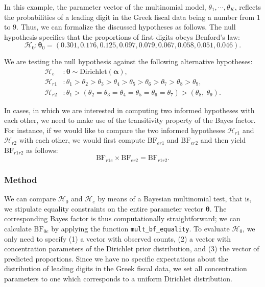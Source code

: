 \documentclass[
  english,
  man,floatsintext]{apa6}
\begin{document}
In this example, the parameter vector of the multinomial model, \(\theta_1, \cdots, \theta_K\), reflects the probabilities of a leading digit in the Greek fiscal data being a number from \(1\) to \(9\). Thus, we can formalize the discussed hypotheses as follows. The null hypothesis specifies that the proportions of first digits obeys Benford's law:
\[\mathcal{H}_0 : \boldsymbol{\theta}_0 = (0.301, 0.176, 0.125, 0.097, 0.079, 0.067, 0.058, 0.051, 0.046).\]

We are testing the null hypothesis against the following alternative hypotheses:
\begin{align*}
\mathcal{H}_e &: \boldsymbol{\theta} \sim \text{Dirichlet}(\boldsymbol{\alpha}), \\
\mathcal{H}_{r1} &: \theta_1 > \theta_2 > \theta_3 > \theta_4 > \theta_5 > \theta_6 > \theta_7 > \theta_8 > \theta_9, \\
\mathcal{H}_{r2} &:  \theta_1 > (\theta_2 = \theta_3 = \theta_4 = \theta_5 = \theta_6 = \theta_7) > (\theta_8, \ \theta_9).
\end{align*}

In cases, in which we are interested in computing two informed hypotheses with each other, we need to make use of the transitivity property of the Bayes factor. For instance, if we would like to compare the two informed hypotheses \(\mathcal{H}_{r1}\) and \(\mathcal{H}_{r2}\) with each other, we would first compute \(\text{BF}_{er1}\) and \(\text{BF}_{er2}\) and then yield \(\text{BF}_{r1r2}\) as follows:
\[\text{BF}_{r1e} \times \text{BF}_{er2} = \text{BF}_{r1r2}.\]

\hypertarget{method}{%
\subsubsection{Method}\label{method}}

We can compare \(\mathcal{H}_0\) and \(\mathcal{H}_e\) by means of a Bayesian multinomial test, that is, we stipulate equality constraints on the entire parameter vector \(\boldsymbol{\theta}\). The corresponding Bayes factor is thus computationally straightforward; we can calculate \(\text{BF}_{0e}\) by applying the function \texttt{mult\_bf\_equality}. To evaluate \(\mathcal{H}_0\), we only need to specify (1) a vector with observed counts, (2) a vector with concentration parameters of the Dirichlet prior distribution, and (3) the vector of predicted proportions. Since we have no specific expectations about the distribution of leading digits in the Greek fiscal data, we set all concentration parameters to one which corresponds to a uniform Dirichlet distribution.
\end{document}
